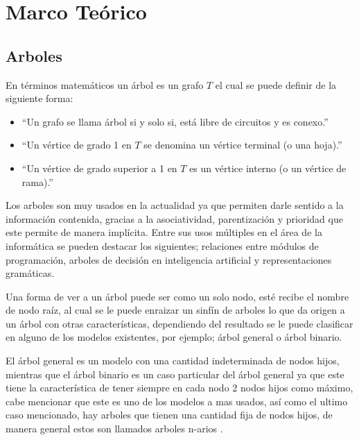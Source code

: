 \chapter{ Marco Teórico  \label{cap2}}
\section{Arboles}
En términos matemáticos un árbol es un grafo $T$ el cual se puede definir de la
 siguiente forma:

\begin{itemize}
	\item ``Un grafo se llama árbol si y solo si, está libre de circuitos y
	 es conexo.''
	\item ``Un vértice de grado 1 en $T$ se denomina un vértice terminal (o una
	 hoja).''
	\item ``Un vértice de grado superior a 1 en $T$ es un vértice interno (o un
	 vértice de rama).''
\end{itemize}

Los arboles son muy usados en la actualidad ya que permiten  darle sentido a
 la información contenida, gracias a la asociatividad, parentización y
 prioridad que este permite de manera implícita. Entre sus usos múltiples en
 el área de la informática se pueden destacar los  siguientes; relaciones
 entre módulos de programación, arboles de decisión en inteligencia artificial
 y representaciones gramáticas\cite{gutierrez1999estructuras}.  

Una forma de ver a un árbol puede ser como un solo nodo, esté recibe el nombre
 de  nodo raíz, al cual se le puede enraizar un sinfín de arboles lo que da
 origen  a un árbol con otras características, dependiendo del resultado se le
 puede clasificar en alguno de los modelos existentes, por ejemplo; árbol 
 general o árbol binario\cite{gutierrez1999estructuras}. 

El árbol general es un modelo con una cantidad indeterminada de nodos hijos,
 mientras que el árbol binario es un caso particular del árbol general ya que
 este tiene la característica de tener siempre en cada nodo 2 nodos hijos como
 máximo, cabe mencionar que este es uno de los modelos a mas usados, así como
 el ultimo caso mencionado, hay arboles que tienen una cantidad fija de nodos
 hijos, de manera general estos son llamados arboles n-arios
 \cite{gutierrez1999estructuras}.
 
